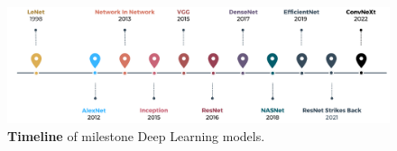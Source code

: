 \begin{figure}[H]
    \centering
    \includegraphics[width=\textwidth]{fig/rel/images/CNN_timeline.pdf}
    \caption{\textbf{Timeline} of milestone Deep Learning models.}
    \label{fig:cnn_timeline}
\end{figure}